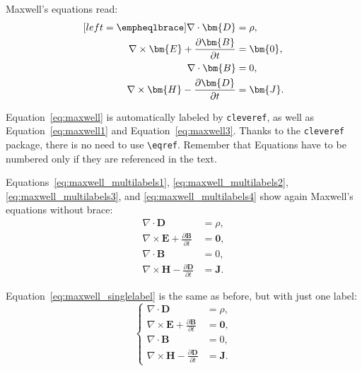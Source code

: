 Maxwell's equations read:
\begin{subequations}
    \label{eq:maxwell}
    \begin{align}[left=\empheqlbrace]
    \nabla\cdot \bm{D} & = \rho, \label{eq:maxwell1} \\
    \nabla \times \bm{E} +  \frac{\partial \bm{B}}{\partial t} & = \bm{0}, \label{eq:maxwell2} \\
    \nabla\cdot \bm{B} & = 0, \label{eq:maxwell3} \\
    \nabla \times \bm{H} - \frac{\partial \bm{D}}{\partial t} &= \bm{J}. \label{eq:maxwell4}
    \end{align}
\end{subequations}

Equation~\eqref{eq:maxwell} is automatically labeled by \texttt{cleveref},
as well as Equation~\eqref{eq:maxwell1} and Equation~\eqref{eq:maxwell3}.
Thanks to the \verb|cleveref| package, there is no need to use \verb|\eqref|.
Remember that Equations have to be numbered only if they are referenced in the text.

Equations~\eqref{eq:maxwell_multilabels1}, \eqref{eq:maxwell_multilabels2}, \eqref{eq:maxwell_multilabels3}, and \eqref{eq:maxwell_multilabels4} show again Maxwell's equations without brace:
\begin{align}
    \nabla\cdot \bm{D} & = \rho, \label{eq:maxwell_multilabels1} \\
    \nabla \times \bm{E} +  \frac{\partial \bm{B}}{\partial t} &= \bm{0}, \label{eq:maxwell_multilabels2} \\
    \nabla\cdot \bm{B} & = 0, \label{eq:maxwell_multilabels3} \\
    \nabla \times \bm{H} - \frac{\partial \bm{D}}{\partial t} &= \bm{J} \label{eq:maxwell_multilabels4}.
\end{align}

Equation~\eqref{eq:maxwell_singlelabel} is the same as before,
but with just one label:
\begin{equation}
    \label{eq:maxwell_singlelabel}
    \left\{
    \begin{aligned}
    \nabla\cdot \bm{D} & = \rho, \\
    \nabla \times \bm{E} +  \frac{\partial \bm{B}}{\partial t} &= \bm{0},\\
    \nabla\cdot \bm{B} & = 0, \\
    \nabla \times \bm{H} - \frac{\partial \bm{D}}{\partial t} &= \bm{J}.
    \end{aligned}
    \right.
\end{equation}

